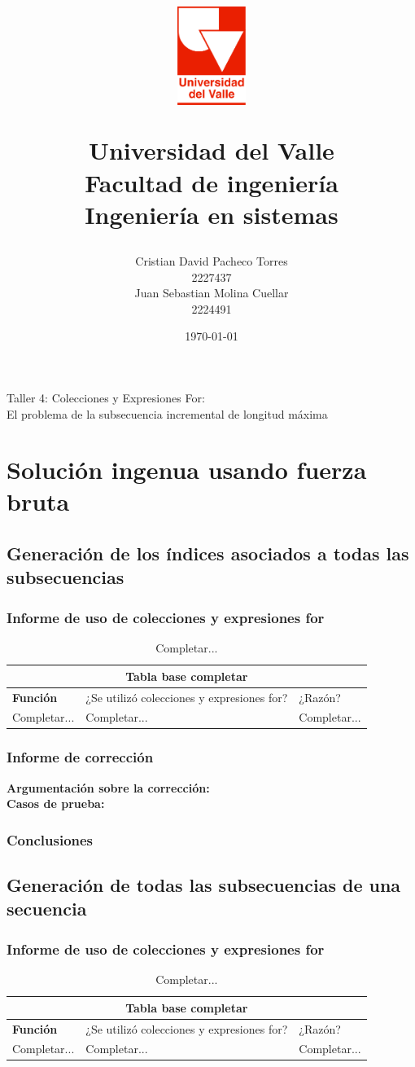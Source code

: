 \documentclass[12pt, a4paper]{article}
\title{
  \begin{figure}[th]
    \centering
    \includegraphics[width=0.2\textwidth]{Univalle}
  \end{figure}
  \textbf{Universidad del Valle
    \\{\Large Facultad de ingeniería}
  \\{\large Ingeniería en sistemas}}}
\author{Cristian David Pacheco Torres
  \\ 2227437
  \\ Juan Sebastian Molina Cuellar
  \\ 2224491}
\date{\today}
\begin{document}
\maketitle
{Taller 4: Colecciones y Expresiones For:
\\ El problema de la subsecuencia incremental de longitud máxima}
\newpage{}

\tableofcontents
\newpage{}
\section{Solución ingenua usando fuerza bruta}
\subsection{Generación de los índices asociados a todas las subsecuencias}
\subsubsection{Informe de uso de colecciones y expresiones for}
\begin{table}[H]
    \scriptsize
   \begin{tabular}{ |p{4cm}|p{3cm}|p{5.5cm}|  }
    \hline
    \multicolumn{3}{|c|}{Tabla base completar} \\
    \hline
    \textbf{Función}& ¿Se utilizó colecciones y expresiones for?  & ¿Razón?\\
    \hline
     Completar... & Completar... &  Completar... \\
     \hline
   \end{tabular}
   \centering
   \caption{Completar...}
   \end{table}
\subsubsection{Informe de corrección}
\textbf{Argumentación sobre la corrección: \\}
\textbf{Casos de prueba: \\}
\subsubsection{Conclusiones}
\subsection{Generación de todas las subsecuencias de una secuencia}
\subsubsection{Informe de uso de colecciones y expresiones for}
\begin{table}[H]
    \scriptsize
   \begin{tabular}{ |p{4cm}|p{3cm}|p{5.5cm}|  }
    \hline
    \multicolumn{3}{|c|}{Tabla base completar} \\
    \hline
    \textbf{Función}& ¿Se utilizó colecciones y expresiones for?  & ¿Razón?\\
    \hline
     Completar... & Completar... &  Completar... \\
     \hline
   \end{tabular}
   \centering
   \caption{Completar...}
   \end{table}
\end{document}
